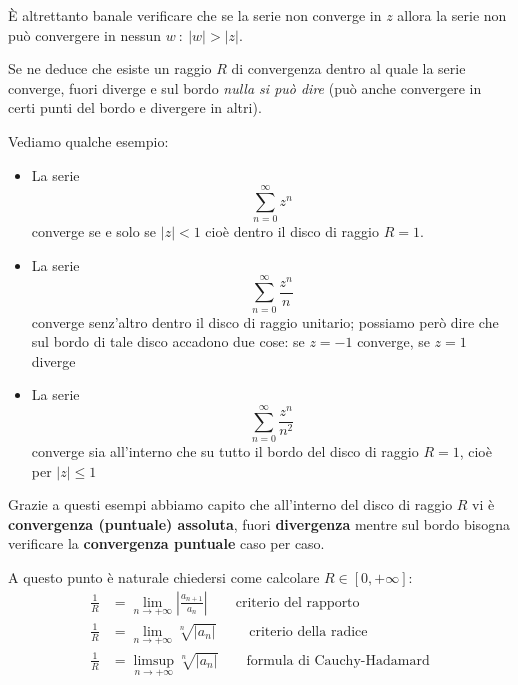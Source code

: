 È altrettanto banale verificare che se la serie non converge in $z$ allora la serie non può convergere in nessun $w\ :\ |w|>|z|$. 

Se ne deduce che esiste un raggio $R$ di convergenza dentro al quale la serie converge, fuori diverge e sul bordo \textit{nulla si può dire} (può anche convergere in certi punti del bordo e divergere in altri).

Vediamo qualche esempio:

\begin{itemize}
\item La serie
\begin{equation*}
\sum\limits^{\infty}_{n = 0} z^{n}
\end{equation*}
converge se e solo se $|z| < 1$ cioè dentro il disco di raggio $R=1$.

\item La serie
\begin{equation*}
\sum\limits^{\infty}_{n = 0}\frac{z^{n}}{n}
\end{equation*}
converge senz'altro dentro il disco di raggio unitario; possiamo però dire che sul bordo di tale disco accadono due cose: se $z=-1$ converge, se $z=1$ diverge

\item La serie
\begin{equation*}
\sum\limits^{\infty}_{n = 0}\frac{z^{n}}{n^{2}}
\end{equation*}
converge sia all'interno che su tutto il bordo del disco di raggio $R=1$, cioè per $| z| \leq 1$
\end{itemize}

\begin{rem}
Grazie a questi esempi abbiamo capito che all'interno del disco di raggio $R$ vi è \textbf{convergenza (puntuale) assoluta}, fuori \textbf{divergenza} mentre sul bordo bisogna verificare la \textbf{convergenza puntuale} caso per caso.
\end{rem}

A questo punto è naturale chiedersi come calcolare $R\in[0,+\infty]$:
\begin{align*}
\frac{1}{R}&=\lim_{n\to+\infty}\left|\frac{a_{n+1}}{a_n}\right| \qquad\text{criterio del rapporto} \\
\frac{1}{R}&=\lim_{n\to+\infty}\sqrt[n]{|a_n|}\qquad\text{ criterio della radice} \\
\frac{1}{R}&=\limsup_{n\to+\infty}\sqrt[n]{|a_n|}\qquad\text{formula di Cauchy-Hadamard}
\end{align*}

